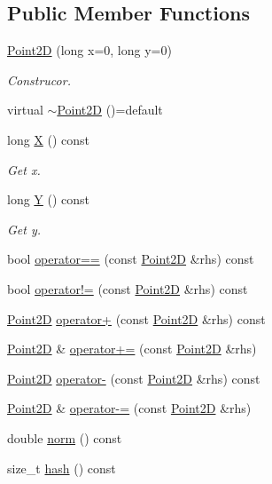 \subsection*{Public Member Functions}
\begin{DoxyCompactItemize}
\item 
\hyperlink{classGeometry_1_1Point2D_a873dc5d6e2f707d70b74e88265a595f6}{Point2D} (long x=0, long y=0)
\begin{DoxyCompactList}\small\item\em Construcor. \end{DoxyCompactList}\item 
virtual \hyperlink{classGeometry_1_1Point2D_a2347379e70ce2907fc497557217e10a3}{$\sim$\+Point2D} ()=default
\item 
long \hyperlink{classGeometry_1_1Point2D_adba56a7597877f2857f019b619c1b31c}{X} () const 
\begin{DoxyCompactList}\small\item\em Get x. \end{DoxyCompactList}\item 
long \hyperlink{classGeometry_1_1Point2D_a766b1824c060c5e625903e6910842f46}{Y} () const 
\begin{DoxyCompactList}\small\item\em Get y. \end{DoxyCompactList}\item 
bool \hyperlink{classGeometry_1_1Point2D_a7ce87ad250d9a716df2d293f8af2accf}{operator==} (const \hyperlink{classGeometry_1_1Point2D}{Point2D} \&rhs) const 
\item 
bool \hyperlink{classGeometry_1_1Point2D_ad97232d7ab2ef71fd78c80796b1654b8}{operator!=} (const \hyperlink{classGeometry_1_1Point2D}{Point2D} \&rhs) const 
\item 
\hyperlink{classGeometry_1_1Point2D}{Point2D} \hyperlink{classGeometry_1_1Point2D_a6c759799b1a736881db4bfe7cbed3ece}{operator+} (const \hyperlink{classGeometry_1_1Point2D}{Point2D} \&rhs) const 
\item 
\hyperlink{classGeometry_1_1Point2D}{Point2D} \& \hyperlink{classGeometry_1_1Point2D_afae0ca03e239fbfbbca63ab76ffdc048}{operator+=} (const \hyperlink{classGeometry_1_1Point2D}{Point2D} \&rhs)
\item 
\hyperlink{classGeometry_1_1Point2D}{Point2D} \hyperlink{classGeometry_1_1Point2D_afb1f91842fd1d67fc404570512ccb03f}{operator-\/} (const \hyperlink{classGeometry_1_1Point2D}{Point2D} \&rhs) const 
\item 
\hyperlink{classGeometry_1_1Point2D}{Point2D} \& \hyperlink{classGeometry_1_1Point2D_aa1993e7157ec63caf7ec10217daafdaf}{operator-\/=} (const \hyperlink{classGeometry_1_1Point2D}{Point2D} \&rhs)
\item 
double \hyperlink{classGeometry_1_1Point2D_a27ecff835c81977e9c2dfcabe34a0e29}{norm} () const 
\item 
size\+\_\+t \hyperlink{classGeometry_1_1Point2D_a45a03b466fadbd77c00480017278519b}{hash} () const 
\end{DoxyCompactItemize}

